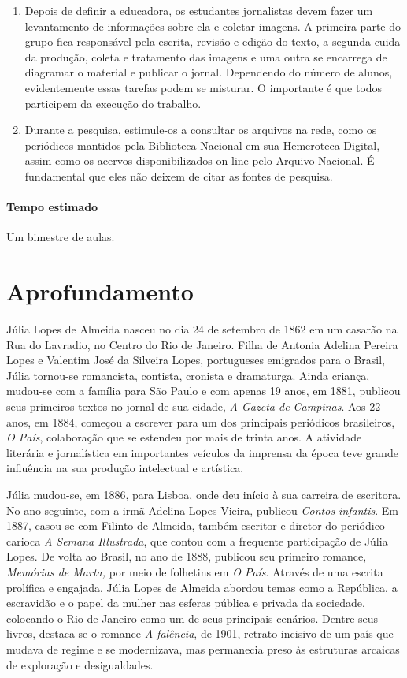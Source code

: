 \documentclass[12pt]{extarticle}
\begin{document}
\begin{enumerate}
\item
Depois de definir a educadora, os estudantes jornalistas devem fazer
um levantamento de informações sobre ela e coletar imagens. A primeira
parte do grupo fica responsável pela escrita, revisão e edição do texto,
a segunda cuida da produção, coleta e tratamento das imagens e uma outra
se encarrega de diagramar o material e publicar o jornal. Dependendo do
número de alunos, evidentemente essas tarefas podem se misturar. O
importante é que todos participem da execução do trabalho.

\item
Durante a pesquisa, estimule-os a consultar os arquivos na rede, como
os periódicos mantidos pela Biblioteca Nacional em sua Hemeroteca
Digital, assim como os acervos disponibilizados on-line pelo Arquivo
Nacional. É fundamental que eles não deixem de citar as fontes de
pesquisa.
\end{enumerate}

\paragraph{Tempo estimado} Um bimestre de aulas.

\section{Aprofundamento}

Júlia Lopes de Almeida nasceu no dia 24 de setembro de 1862 em um
casarão na Rua do Lavradio, no Centro do Rio de Janeiro. Filha de
Antonia Adelina Pereira Lopes e Valentim José da Silveira Lopes,
portugueses emigrados para o Brasil, Júlia tornou-se romancista,
contista, cronista e dramaturga. Ainda criança, mudou-se com a família
para São Paulo e com apenas 19 anos, em 1881, publicou seus primeiros
textos no jornal de sua cidade, \emph{A Gazeta de Campinas}. Aos 22
anos, em 1884, começou a escrever para um dos principais periódicos
brasileiros, \emph{O País}, colaboração que se estendeu por mais de
trinta anos. A atividade literária e jornalística em importantes
veículos da imprensa da época teve grande influência na sua produção
intelectual e artística.

Júlia mudou-se, em 1886, para Lisboa, onde deu início à sua carreira de
escritora. No ano seguinte, com a irmã Adelina Lopes Vieira, publicou
\emph{Contos infantis}. Em 1887, casou-se com Filinto de Almeida, também
escritor e diretor do periódico carioca \emph{A Semana Illustrada}, que
contou com a frequente participação de Júlia Lopes. De volta ao Brasil,
no ano de 1888, publicou seu primeiro romance, \emph{Memórias de Marta,}
por meio de folhetins em \emph{O País}. Através de uma escrita prolífica
e engajada, Júlia Lopes de Almeida abordou temas como a República, a
escravidão e o papel da mulher nas esferas pública e privada da
sociedade, colocando o Rio de Janeiro como um de seus principais
cenários. Dentre seus livros, destaca-se o romance \emph{A falência}, de
1901, retrato incisivo de um país que mudava de regime e se modernizava,
mas permanecia preso às estruturas arcaicas de exploração e
desigualdades.
\end{document}

